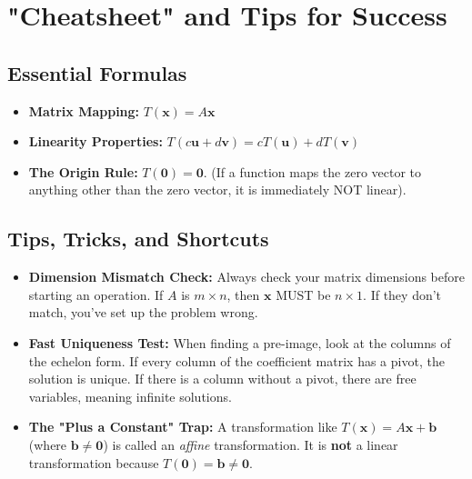\documentclass[11pt]{article}
\begin{document}
\section{"Cheatsheet" and Tips for Success}

\subsection{Essential Formulas}
\begin{itemize}
    \item \textbf{Matrix Mapping:} $T(\mathbf{x}) = A\mathbf{x}$
    \item \textbf{Linearity Properties:} $T(c\mathbf{u} + d\mathbf{v}) = cT(\mathbf{u}) + dT(\mathbf{v})$
    \item \textbf{The Origin Rule:} $T(\mathbf{0}) = \mathbf{0}$. (If a function maps the zero vector to anything other than the zero vector, it is immediately NOT linear).
\end{itemize}

\subsection{Tips, Tricks, and Shortcuts}
\begin{itemize}
    \item \textbf{Dimension Mismatch Check:} Always check your matrix dimensions before starting an operation. If $A$ is $m \times n$, then $\mathbf{x}$ MUST be $n \times 1$. If they don't match, you've set up the problem wrong.
    \item \textbf{Fast Uniqueness Test:} When finding a pre-image, look at the columns of the echelon form. If every column of the coefficient matrix has a pivot, the solution is unique. If there is a column without a pivot, there are free variables, meaning infinite solutions.
    \item \textbf{The "Plus a Constant" Trap:} A transformation like $T(\mathbf{x}) = A\mathbf{x} + \mathbf{b}$ (where $\mathbf{b} \neq \mathbf{0}$) is called an \textit{affine} transformation. It is \textbf{not} a linear transformation because $T(\mathbf{0}) = \mathbf{b} \neq \mathbf{0}$. 
\end{itemize}

\end{document}
